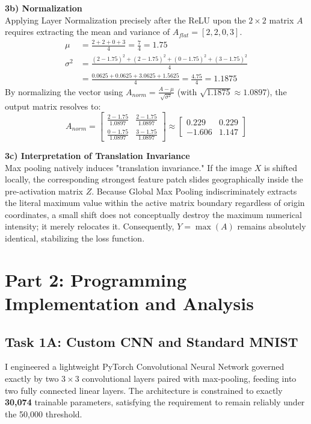 \documentclass[12pt,a4paper]{article}
\begin{document}
\textbf{3b) Normalization}\\
Applying Layer Normalization precisely after the ReLU upon the $2 \times 2$ matrix $A$ requires extracting the mean and variance of $A_{flat} = [2, 2, 0, 3]$.
\begin{align*}
    \mu &= \frac{2 + 2 + 0 + 3}{4} = \frac{7}{4} = 1.75 \\
    \sigma^2 &= \frac{(2-1.75)^2 + (2-1.75)^2 + (0-1.75)^2 + (3-1.75)^2}{4} \\
             &= \frac{0.0625 + 0.0625 + 3.0625 + 1.5625}{4} = \frac{4.75}{4} = 1.1875
\end{align*}
By normalizing the vector using $A_{norm} = \frac{A - \mu}{\sqrt{\sigma^2}}$ (with $\sqrt{1.1875} \approx 1.0897$), the output matrix resolves to:
\[ A_{norm} = \begin{bmatrix} \frac{2-1.75}{1.0897} & \frac{2-1.75}{1.0897} \\ \frac{0-1.75}{1.0897} & \frac{3-1.75}{1.0897} \end{bmatrix} \approx \begin{bmatrix} 0.229 & 0.229 \\ -1.606 & 1.147 \end{bmatrix} \]

\textbf{3c) Interpretation of Translation Invariance}\\
Max pooling natively induces "translation invariance." If the image $X$ is shifted locally, the corresponding strongest feature patch slides geographically inside the pre-activation matrix $Z$. Because Global Max Pooling indiscriminately extracts the literal maximum value within the active matrix boundary regardless of origin coordinates, a small shift does not conceptually destroy the maximum numerical intensity; it merely relocates it. Consequently, $Y = \max(A)$ remains absolutely identical, stabilizing the loss function.

\newpage
\section*{Part 2: Programming Implementation and Analysis}

\subsection*{Task 1A: Custom CNN and Standard MNIST}
I engineered a lightweight PyTorch Convolutional Neural Network governed exactly by two $3 \times 3$ convolutional layers paired with max-pooling, feeding into two fully connected linear layers. The architecture is constrained to exactly \textbf{30,074} trainable parameters, satisfying the requirement to remain reliably under the 50,000 threshold.
\end{document}
